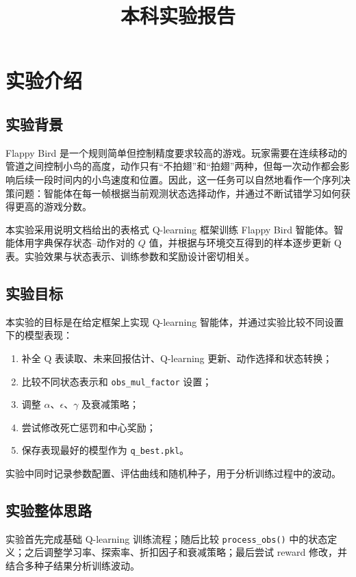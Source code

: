 \documentclass{zjureport}
\title{本科实验报告}
\date{}
\begin{document}
\makecover
\makecontent

\section{实验介绍}

\subsection{实验背景}

Flappy Bird 是一个规则简单但控制精度要求较高的游戏。玩家需要在连续移动的管道之间控制小鸟的高度，动作只有“不拍翅”和“拍翅”两种，但每一次动作都会影响后续一段时间内的小鸟速度和位置。因此，这一任务可以自然地看作一个序列决策问题：智能体在每一帧根据当前观测状态选择动作，并通过不断试错学习如何获得更高的游戏分数。

本实验采用说明文档给出的表格式 Q-learning 框架训练 Flappy Bird 智能体。智能体用字典保存状态--动作对的 $Q$ 值，并根据与环境交互得到的样本逐步更新 Q 表。实验效果与状态表示、训练参数和奖励设计密切相关。

\subsection{实验目标}

本实验的目标是在给定框架上实现 Q-learning 智能体，并通过实验比较不同设置下的模型表现：

\begin{enumerate}
    \item 补全 Q 表读取、未来回报估计、Q-learning 更新、动作选择和状态转换；
    \item 比较不同状态表示和 \texttt{obs\_mul\_factor} 设置；
    \item 调整 $\alpha$、$\epsilon$、$\gamma$ 及衰减策略；
    \item 尝试修改死亡惩罚和中心奖励；
    \item 保存表现最好的模型作为 \texttt{q\_best.pkl}。
\end{enumerate}

实验中同时记录参数配置、评估曲线和随机种子，用于分析训练过程中的波动。

\subsection{实验整体思路}

实验首先完成基础 Q-learning 训练流程；随后比较 \texttt{process\_obs()} 中的状态定义；之后调整学习率、探索率、折扣因子和衰减策略；最后尝试 reward 修改，并结合多种子结果分析训练波动。
\end{document}
